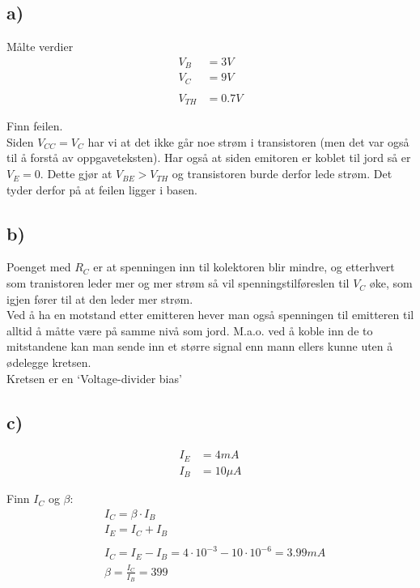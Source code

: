 \documentclass[a4paper, norsk, twoside, 10pt]{article}
\begin{document}
\subsection*{a)}
Målte verdier
\begin{align*}
V_{B} &= 3V\\
V_{C} &= 9V\\
\\
V_{TH} &= 0.7V
\end{align*}

Finn feilen.\\
Siden $V_{CC} = V_{C}$ har vi at det ikke går noe strøm i transistoren (men det var også til å forstå av oppgaveteksten). Har også at siden emitoren er koblet til jord så er $V_{E} =0$. Dette gjør at $V_{BE} > V_{TH}$ og transistoren burde derfor lede strøm. Det tyder derfor på at feilen ligger i basen.


\subsection*{b)}
Poenget med $R_{C}$ er at spenningen inn til kolektoren blir mindre, og etterhvert som tranistoren leder mer og mer strøm så vil spenningstilføreslen til $V_{C}$ øke, som igjen fører til at den leder mer strøm.
\\
Ved å ha en motstand etter emitteren hever man også spenningen til emitteren til alltid å måtte være på samme nivå som jord. M.a.o. ved å koble inn de to mitstandene kan man sende inn et større signal enn mann ellers kunne uten å ødelegge kretsen.
\\
Kretsen er en `Voltage-divider bias'




\subsection*{c)}
\begin{align*}
  I_{E} &= 4mA\\
  I_{B} &= 10\mu A
\end{align*}

Finn $I_{C}$ og $\beta$:\\
\begin{align*}
  &I_{C} = \beta \cdot I_{B} \\
  &I_{E} = I_{C} + I_{B} \\
  \\
  &I_{C} = I_{E} - I_{B} = 4\cdot 10^{-3} - 10\cdot 10^{-6} = 3.99mA \\
  &\beta = \frac{I_{C}}{I_{B}} = 399
\end{align*}
\end{document}
